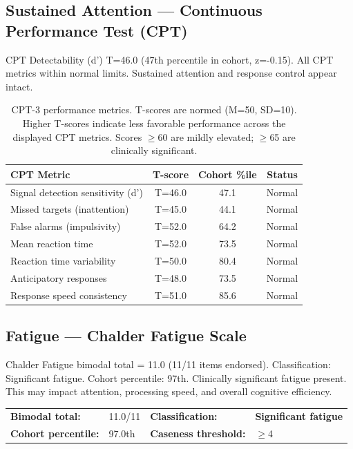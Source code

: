 \documentclass[11pt,a4paper]{article}
\begin{document}
\subsection{Sustained Attention --- Continuous Performance Test (CPT)}
CPT Detectability (d') T=46.0 (47th percentile in cohort, z=-0.15). All CPT metrics within normal limits. Sustained attention and response control appear intact.

\begin{table}[H]
\centering\small
\begin{tabular}{lccc}
\toprule
\textbf{CPT Metric} & \textbf{T-score} & \textbf{Cohort \%ile} & \textbf{Status} \\
\midrule
    Signal detection sensitivity (d') & T=46.0 & 47.1 & \textcolor{clingreen}{Normal} \\
    Missed targets (inattention) & T=45.0 & 44.1 & \textcolor{clingreen}{Normal} \\
    False alarms (impulsivity) & T=52.0 & 64.2 & \textcolor{clingreen}{Normal} \\
    Mean reaction time & T=52.0 & 73.5 & \textcolor{clingreen}{Normal} \\
    Reaction time variability & T=50.0 & 80.4 & \textcolor{clingreen}{Normal} \\
    Anticipatory responses & T=48.0 & 73.5 & \textcolor{clingreen}{Normal} \\
    Response speed consistency & T=51.0 & 85.6 & \textcolor{clingreen}{Normal} \\
\bottomrule
\end{tabular}
\caption{CPT-3 performance metrics. T-scores are normed (M=50, SD=10). Higher T-scores indicate less favorable performance across the displayed CPT metrics. Scores $\geq$60 are mildly elevated; $\geq$65 are clinically significant.}
\end{table}

\subsection{Fatigue --- Chalder Fatigue Scale}
Chalder Fatigue bimodal total = 11.0 (11/11 items endorsed). Classification: Significant fatigue. Cohort percentile: 97th. Clinically significant fatigue present. This may impact attention, processing speed, and overall cognitive efficiency.

\noindent\begin{tabular}{llll}
\textbf{Bimodal total:} & 11.0/11 &
\textbf{Classification:} & \textbf{Significant fatigue} \\
\textbf{Cohort percentile:} & 97.0th &
\textbf{Caseness threshold:} & $\geq$4 \\
\end{tabular}
\end{document}
